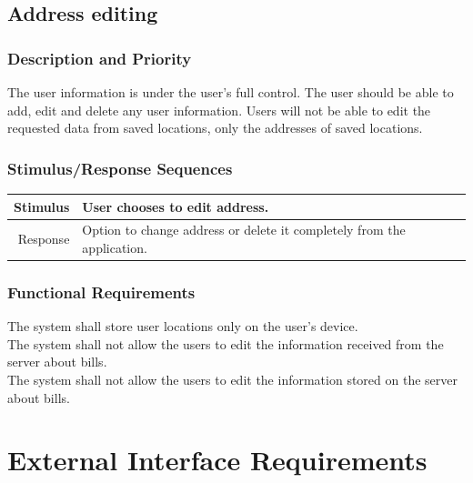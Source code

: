 \documentclass[12pt,oneside,letterpaper]{article}
\makeatletter
\newcounter{use_case}
\newcounter{functional_requirement}
\newcounter{tableline}
\newcommand{\functionalrequirementprinter}{\stepcounter{tableline}
\ifthenelse{\value{tableline}>1}{\refstepcounter{functional_requirement}
  FR-\arabic{functional_requirement}}{Requirement ID}
}
\newenvironment{func_req}{
\setcounter{tableline}{0}
\begin{longtabu}{|@{\makebox[8em][r]{\functionalrequirementprinter}}|X|}
  \hline
  Description \\
}{
\end{longtabu}
}
\makeatother
\begin{document}
\subsection{Address editing}
\subsubsection{Description and Priority}
The user information is under the user's full control. The user should
be able to add, edit and delete any user information. Users will not
be able to edit the requested data from saved locations, only the
addresses of saved locations.
\subsubsection{Stimulus/Response Sequences}
\begin{longtabu}{|r|X|}
  \hline
  Stimulus & User chooses to edit address. \\
  \hline
  Response & Option to change address or delete it completely from the application. \\
  \hline
\end{longtabu}
\subsubsection{Functional Requirements}
\begin{func_req}
  \hline
  The system shall store user locations only on the user's device. \\
  \hline
  The system shall not allow the users to edit the information received from the server about bills.\\
  \hline
  The system shall not allow the users to edit the information stored on the server about bills.\\
  \hline
\end{func_req}

\section{External Interface Requirements}
\end{document}
